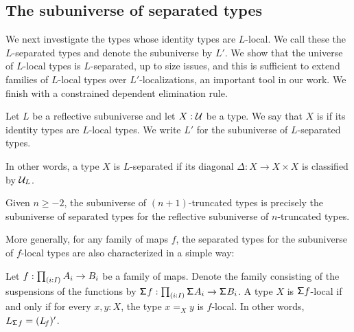 \subsection{The subuniverse of separated types}\label{ss:separated-types}

We next investigate the types whose identity types are $L$-local.
We call these the $L$-separated types and denote the subuniverse by $L'$.
We show that the universe of $L$-local types is $L$-separated, up to size
issues, and this is sufficient to extend families of $L$-local types over
$L'$-localizations, an important tool in our work.
We finish with a constrained dependent elimination rule.

\begin{defn}
Let $L$ be a reflective subuniverse and let $X : \mathcal{U}$ be a type. 
We say that $X$ is  if its identity types are $L$-local types.
We write $L'$ for the subuniverse of $L$-separated types.
\end{defn}

In other words, a type $X$ is $L$-separated if its diagonal $\Delta:X\to X\times X$ is classified by $\mathcal{U}_L$.

\begin{eg}\label{example:truncationisseparated}
Given $n \geq -2$, the subuniverse of $(n+1)$-truncated types is precisely the subuniverse of separated types for the reflective subuniverse of $n$-truncated types.
\end{eg}

More generally, for any family of maps $f$,
the separated types for the subuniverse of $f$-local types
are also characterized in a simple way: 

\begin{lem}\label{lemma:characterizationsigmaflocal}
    Let $f:\prd{i:I}A_i\to B_i$ be a family of maps. Denote the family consisting of the suspensions
    of the functions by $\susp{f} : \prd{i:I} \susp{A_i} \to \susp{B_i}$.
    A type $X$ is $\mathsf{\Sigma} f$-local if and only if for every $x,y : X$, the type
    $x =_X y$ is $f$-local.
    In other words, $L_{\mathsf{\Sigma}^{}{f}} = (L_{\!f})'$.
\end{lem}

